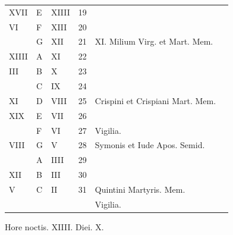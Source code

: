 \begin{center}
\begin{tabular}{l | l | l | r | l l}
\color{Red} XVII & E & \color{Red} XIIII & 19 & & \color{Red} \\
\color{Red} VI & F & \color{Red} XIII & 20 & & \color{Red} \\
\color{Red}  & G & \color{Red} XII & 21 & \multicolumn{2}{l}{\color{Red} XI. Milium Virg. et Mart. Mem.} \\
\color{Red} XIIII & \color{Red} A & \color{Red} XI & 22 & & \color{Red} \\
\color{Red} III & B & \color{Red} X & 23 &  & \color{Red} \\
\color{Red}  & C & \color{Red} IX & 24 & & \color{Red} \\
\color{Red} XI & D & \color{Red} VIII & 25 & Crispini et Crispiani Mart. Mem. & \color{Red} \\
\color{Red} XIX & E & \color{Red} VII & 26 & & \color{Red} \\
\color{Red}  & F & \color{Red} VI & 27 &  \qquad \color{Red} Vigilia. \\
\color{Red} VIII & G & \color{Red} V & 28 & \color{Red} Symonis et Iude Apos. Semid. & \color{Red} \\
\color{Red}  & \color{Red} A & \color{Red} IIII & 29 & & \color{Red} \\
\color{Red} XII & B & \color{Red} III & 30 &  & \color{Red} \\
\color{Red} V & C & \color{Red} II & 31 & Quintini Martyris. Mem. & \\
& & & & \qquad Vigilia. \color{Red} \\
\end{tabular}
\newline \color{Red} Hore noctis. XIIII. Diei. X.
\end{center}



\newpage
\color{Red}\color{black}

